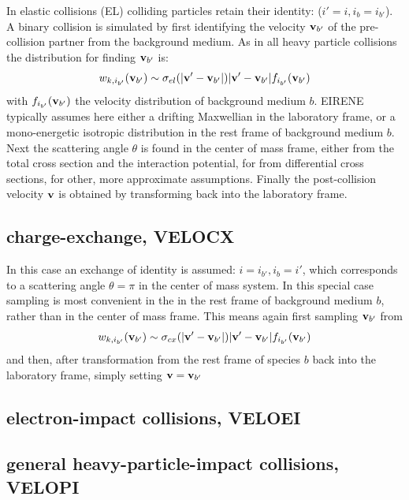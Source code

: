 In elastic collisions (EL) colliding particles retain their identity: ($i' = i,
  i_b = i_{b'}$).
A binary collision is simulated by first identifying the velocity $\mathbf{v}_{b'}$ of
the pre-collision partner from the background medium.
As in all heavy particle collisions the distribution for finding $\mathbf{v}_{b'}$ is:
\begin{displaymath}
  w_{k,i_{b'}}
  (\mathbf{v}_{b'}) \sim \sigma_{el}(|\mathbf{v}'-\mathbf{v}_{b'}|) |\mathbf{v}'-\mathbf{v}_{b'}|
  f_{i_{b'}}(\mathbf{v}_{b'})
\end{displaymath}
with $f_{i_{b'}}(\mathbf{v}_{b'})$ the velocity
distribution of background medium $b$.
EIRENE typically assumes here either a drifting Maxwellian in the laboratory
frame, or a mono-energetic isotropic distribution in the rest frame of
background medium $b$.
Next the scattering angle $\theta$ is found in the center of mass frame, either
from the total cross section and the interaction potential, for from
differential cross sections, for other, more approximate assumptions.
Finally the post-collision velocity $\mathbf{v}$ is obtained by transforming back into
the laboratory frame.

\subsection{charge-exchange, VELOCX}

In this case an exchange of identity is assumed:  $i = i_{b'},	 i_b = i'$,
which corresponds to a scattering angle $\theta = \pi$ in the center of mass
system.
In this special case sampling is most convenient in the in the rest frame of
background medium $b$, rather than in the center of mass frame.
This means again first sampling $\mathbf{v}_{b'}$ from
\begin{displaymath}
  w_{k,i_{b'}}(\mathbf{v}_{b'}) \sim \sigma_{cx}(|\mathbf{v}'-\mathbf{v}_{b'}|) |\mathbf{v}'-\mathbf{v}_{b'}|
  f_{i_{b'}}(\mathbf{v}_{b'})
\end{displaymath}
and then, after transformation from the
rest frame of species $b$ back into the laboratory frame, simply setting $\mathbf{v} =
  \mathbf{v}_{b'}$ 

\subsection{electron-impact collisions, VELOEI} 

\subsection{general heavy-particle-impact collisions, VELOPI}

